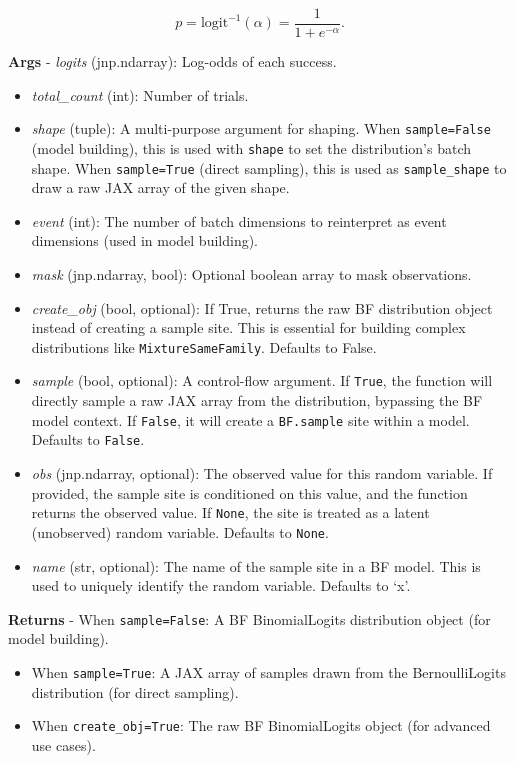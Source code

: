 \documentclass[
  letterpaper,
  DIV=11,
  numbers=noendperiod]{scrartcl}
\begin{document}
\[
p = \mathrm{logit}^{-1}(\alpha) = \frac{1}{1 + e^{-\alpha}}.
\]

\textbf{Args} - \emph{logits} (jnp.ndarray): Log-odds of each success.

\begin{itemize}
\item
  \emph{total\_count} (int): Number of trials.
\item
  \emph{shape} (tuple): A multi-purpose argument for shaping. When
  \texttt{sample=False} (model building), this is used with
  \texttt{shape} to set the distribution's batch shape. When
  \texttt{sample=True} (direct sampling), this is used as
  \texttt{sample\_shape} to draw a raw JAX array of the given shape.
\item
  \emph{event} (int): The number of batch dimensions to reinterpret as
  event dimensions (used in model building).
\item
  \emph{mask} (jnp.ndarray, bool): Optional boolean array to mask
  observations.
\item
  \emph{create\_obj} (bool, optional): If True, returns the raw BF
  distribution object instead of creating a sample site. This is
  essential for building complex distributions like
  \texttt{MixtureSameFamily}. Defaults to False.
\item
  \emph{sample} (bool, optional): A control-flow argument. If
  \texttt{True}, the function will directly sample a raw JAX array from
  the distribution, bypassing the BF model context. If \texttt{False},
  it will create a \texttt{BF.sample} site within a model. Defaults to
  \texttt{False}.
\item
  \emph{obs} (jnp.ndarray, optional): The observed value for this random
  variable. If provided, the sample site is conditioned on this value,
  and the function returns the observed value. If \texttt{None}, the
  site is treated as a latent (unobserved) random variable. Defaults to
  \texttt{None}.
\item
  \emph{name} (str, optional): The name of the sample site in a BF
  model. This is used to uniquely identify the random variable. Defaults
  to `x'.
\end{itemize}

\textbf{Returns} - When \texttt{sample=False}: A BF BinomialLogits
distribution object (for model building).

\begin{itemize}
\item
  When \texttt{sample=True}: A JAX array of samples drawn from the
  BernoulliLogits distribution (for direct sampling).
\item
  When \texttt{create\_obj=True}: The raw BF BinomialLogits object (for
  advanced use cases).
\end{itemize}
\end{document}
